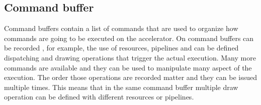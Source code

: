 \subsection{Command buffer}
Command buffers contain a list of commands that are used to organize how commands are going to be executed on the accelerator. On command buffers can be recorded , for example, the use of resources, pipelines and can be defined dispatching and drawing operations that trigger the actual execution. Many more commands are available and they can be used to manipulate many aspect of the execution. The order those operations are recorded matter and they can be issued multiple times. This means that in the same command buffer multiple draw operation can be defined with different resources or pipelines.
